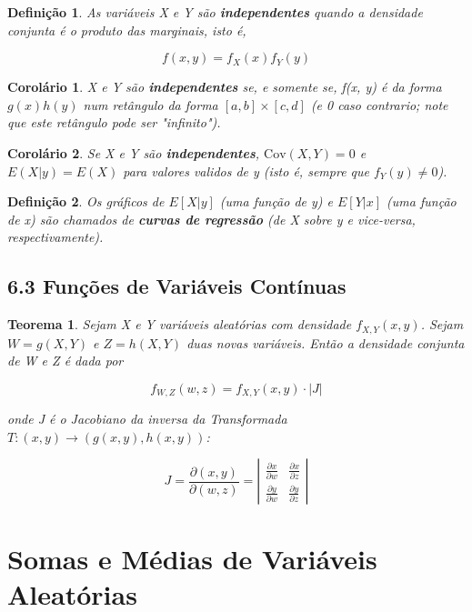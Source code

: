 \documentclass[12pt]{article}
\newtheorem{theorem}{Teorema}[section]
\newtheorem{corollary}{Corolário}[theorem]
\newtheorem{definition}{Definição}
\begin{document}
\begin{definition}
    As variáveis X e Y são \textbf{independentes} quando a densidade conjunta é o produto das marginais, isto é,
    
    $$f(x, y) = f_X (x) f_Y (y)$$
\end{definition}

\begin{corollary}
    X e Y são \textbf{independentes} se, e somente se, f(x, y) é da forma $g(x) h(y)$ num retângulo da forma $[a, b] \times [c, d]$ (e 0 caso contrario; note que este retângulo pode ser "infinito").
\end{corollary}

\begin{corollary}
    Se X e Y são \textbf{independentes}, $\text{Cov} (X, Y) = 0$ e $E(X | y) = E(X)$ para valores validos de y (isto é, sempre que $f_Y (y) \neq 0$).
\end{corollary}

\begin{definition}
    Os gráficos de $E[X|y]$ (uma função de y) e $E[Y|x]$ (uma função de x) são chamados de \textbf{curvas de regressão} (de X sobre y e vice-versa, respectivamente).
\end{definition}

\subsection*{6.3 Funções de Variáveis Contínuas}
\begin{theorem}
    Sejam X e Y variáveis aleatórias com densidade $f_{X, Y} (x, y)$. Sejam $W = g(X, Y)$ e $Z = h(X, Y)$ duas novas variáveis. Então a densidade conjunta de W e Z é dada por
    
    $$f_{W,Z} (w, z) = f_{X, Y} (x, y) \cdot |J|$$
    
    onde J é o Jacobiano da inversa da Transformada $T : (x, y) \rightarrow{} (g(x, y), h(x, y))$:
    
    $$J = \frac{\partial (x,y)}{\partial (w, z)} = \left | \begin{array}{cc}
        \frac{\partial x}{\partial w} & \frac{\partial x}{\partial z} \\
        \frac{\partial y}{\partial w} & \frac{\partial y}{\partial z}
    \end{array} \right |$$
\end{theorem}

\section{Somas e Médias de Variáveis Aleatórias}
\end{document}
